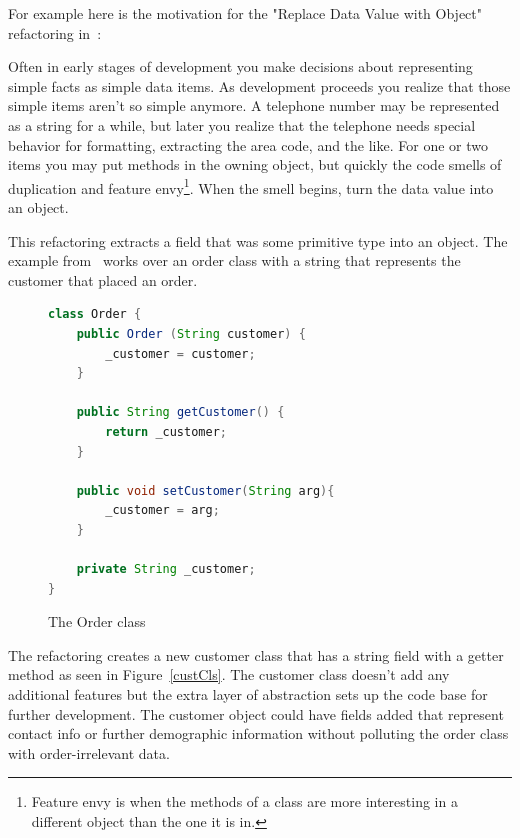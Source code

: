 For example here is the motivation for the "Replace Data Value with Object" refactoring in~\citep[pg. 175]{fowler}:

\begin{displayquote}
Often in early stages of development you make decisions about representing simple facts as simple data items. As development proceeds you realize that those simple items aren't so simple anymore. A telephone number may be represented as a string for a while, but later you realize that the telephone needs special behavior for formatting, extracting the area code, and the like. For one or two items you may put methods in the owning object, but quickly the code smells of duplication and feature envy\footnote{Feature envy is when the methods of a class are more interesting in a different object than the one it is in.}. When the smell begins, turn the data value into an object.
\end{displayquote}

This refactoring extracts a field that was some primitive type into an object. The example from~\citep{fowler} works over an order class with a string that represents the customer that placed an order.

\begin{figure}[t]
\begin{lstlisting}[language = java,tabsize=4]
class Order {
	public Order (String customer) {
		_customer = customer;	
	}
	
	public String getCustomer() {
		return _customer;
	}
	
	public void setCustomer(String arg){
		_customer = arg;	
	}
	
	private String _customer;
}
\end{lstlisting}
\caption{The Order class}
\end{figure}

The refactoring creates a new customer class that has a string field with a getter method as seen in Figure~\ref{custCls}. The customer class doesn't add any additional features but the extra layer of abstraction sets up the code base for further development. The customer object could have fields added that represent contact info or further demographic information without polluting the order class with order-irrelevant data.

